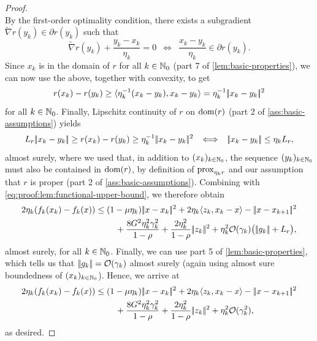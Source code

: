 \begin{proof}
\[    \]
    By the first-order optimality condition, there exists a subgradient $\tilde{\nabla} r(y_k) \in \partial r(y_k)$ such that
    \[
        \tilde{\nabla} r(y_k) + \frac{y_k - x_k}{\eta_k} = 0 \enspace\iff\enspace \frac{x_k - y_k}{\eta_k} \in \partial r(y_k).
    \]
    Since $x_k$ is in the domain of $r$ for all $k\in\mathbb{N}_0$ (part 7 of \cref{lem:basic-properties}),
    we can now use the above, together with convexity, to get
    \[
        r(x_k) - r(y_k) \geq \langle \eta_k^{-1} (x_k - y_k), x_k - y_k \rangle = \eta_k^{-1} |\!|x_k - y_k|\!|^2
    \]
    for all $k\in\mathbb{N}_0$.
    Finally, Lipschitz continuity of $r$ on $\operatorname{dom}(r)$ (part 2 of \cref{ass:basic-assumptions}) yields
    \[
        L_r |\!|x_k - y_k|\!| \geq r(x_k) - r(y_k) \geq \eta_k^{-1} |\!|x_k - y_k|\!|^2
        \enspace\iff\enspace
        |\!|x_k - y_k|\!| \leq \eta_k L_r,
    \]
    almost surely, where we used that, in addition to $(x_k)_{k\in\mathbb{N}_0}$, the sequence $(y_k)_{k\in\mathbb{N}_0}$ must also be
    contained in $\operatorname{dom}(r)$, by definition of $\operatorname{prox}_{\eta_k r}$ and our assumption
    that $r$ is proper (part 2 of \cref{ass:basic-assumptions}).
    Combining with \eqref{eq:proof:lem:functional-upper-bound}, we therefore obtain
    \begin{align*}
        2\eta_k(f_k(x_k) - f_k(x))
        &\leq ( 1 - \mu\eta_k ) \norm{x - x_k}^2 + 2\eta_k\langle z_k, x_k - x \rangle 
            - \norm{x - x_{k+1}}^2 \notag \\
        &\phantom{===} + \frac{8 G^2\eta_k^2\gamma_k^2}{1 - \rho}
            + \frac{2\eta_k^2}{1 - \rho}\norm{z_k}^2
            + \eta_k^2 \mathcal{O}(\gamma_k) \big( \norm{g_k} + L_r \big),
    \end{align*}
    almost surely, for all $k\in\mathbb{N}_0$.
    Finally, we can use part 5 of \cref{lem:basic-properties}, which tells us that $|\!|g_k|\!| = \mathcal{O}(\gamma_k)$
    almost surely (again using almost sure boundedness of $(x_k)_{k\in\mathbb{N}_0}$). Hence, we arrive at
    \begin{align*}
        2\eta_k(f_k(x_k) - f_k(x))
        &\leq ( 1 - \mu\eta_k ) |\!|x - x_k|\!|^2 + 2\eta_k\langle z_k, x_k - x \rangle 
            - |\!|x - x_{k+1}|\!|^2 \notag \\
        &\phantom{===} + \frac{8 G^2\eta_k^2\gamma_k^2}{1 - \rho}
            + \frac{2\eta_k^2}{1 - \rho}|\!|z_k|\!|^2
            + \eta_k^2 \mathcal{O}(\gamma_k^2),
    \end{align*}
    as desired.
\end{proof}

